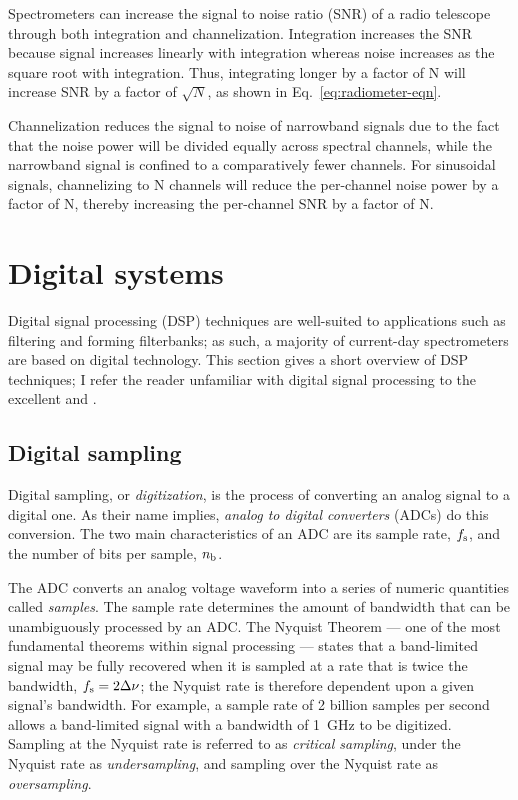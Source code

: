 \documentclass{ws-rv961x669}
\begin{document}
Spectrometers can increase the signal to noise ratio (SNR) of a radio telescope through both integration and channelization. Integration increases the SNR because signal increases linearly with integration whereas noise increases as the square root with integration. Thus, integrating longer by a factor of N will increase SNR by a factor of $\sqrt{N}$, as shown in Eq.~\ref{eq:radiometer-eqn}.

Channelization reduces the signal to noise of narrowband signals due to the fact that the noise power will be divided equally across spectral channels, while the narrowband signal is confined to a comparatively fewer channels. For sinusoidal signals, channelizing to N channels will reduce the per-channel noise power by a factor of N, thereby increasing the per-channel SNR by a factor of N.


\section{Digital systems}

Digital signal processing (DSP) techniques are well-suited to applications such as filtering and forming filterbanks; as such, a majority of current-day spectrometers are based on digital technology. This section gives a short overview of DSP techniques; I refer the reader unfamiliar with digital signal processing to the excellent \citet{bookLyonsDSP} and \citet{BookSmithDSP}. 

\subsection{Digital sampling}

Digital sampling, or \emph{digitization}, is the process of converting an analog signal to a digital one. As their name implies, \emph{analog to digital converters} (ADCs) do this conversion. The two main characteristics of an ADC are its sample rate, $f_{\rm{s}}$, and the number of bits per sample, $n_{\rm{b}}$.

The ADC converts an analog voltage waveform into a series of numeric quantities called \emph{samples}. The sample rate determines the amount of bandwidth that can be unambiguously processed by an ADC. The Nyquist Theorem --- one of the most fundamental theorems within signal processing --- states that a band-limited signal may be fully recovered when it is sampled at a rate that is twice the bandwidth, $f_{\rm{s}} = 2 \Delta\nu$; the Nyquist rate is therefore dependent upon a given signal's bandwidth. For example, a sample rate of 2 billion samples per second allows a band-limited signal with a bandwidth of 1~GHz to be digitized. Sampling at the  Nyquist rate is referred to as \emph{critical sampling}, under the Nyquist rate as \emph{undersampling}, and sampling over the Nyquist rate as \emph{oversampling}.
\end{document}
